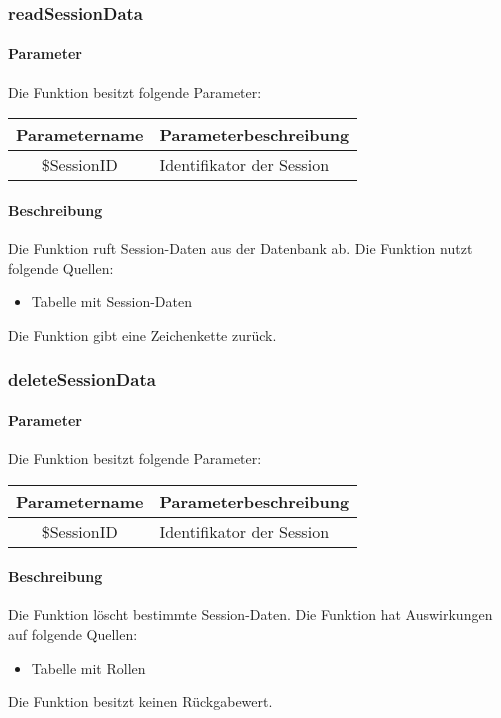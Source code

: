 \subsubsection{readSessionData}
\paragraph{Parameter} Die Funktion besitzt folgende Parameter:
\begin{table}[H]
	\begin{tabular}{|c|p{11cm}|}
		\hline
		\textbf{Parametername} & \textbf{Parameterbeschreibung} \\ \hline
		\$SessionID & Identifikator der Session \\ \hline
	\end{tabular}
\end{table}
\paragraph{Beschreibung} Die Funktion ruft Session-Daten aus der Datenbank ab. Die Funktion nutzt folgende Quellen:
\begin{itemize}
	\item Tabelle mit Session-Daten
\end{itemize}
Die Funktion gibt eine Zeichenkette zurück.
\subsubsection{deleteSessionData}
\paragraph{Parameter} Die Funktion besitzt folgende Parameter:
\begin{table}[H]
	\begin{tabular}{|c|p{11cm}|}
		\hline
		\textbf{Parametername} & \textbf{Parameterbeschreibung} \\ \hline
		\$SessionID & Identifikator der Session \\ \hline
	\end{tabular}
\end{table}
\paragraph{Beschreibung} Die Funktion löscht bestimmte Session-Daten. Die Funktion hat Auswirkungen auf folgende Quellen:
\begin{itemize}
	\item Tabelle mit Rollen
\end{itemize}
Die Funktion besitzt keinen Rückgabewert.
